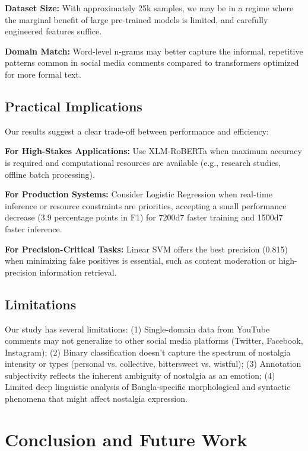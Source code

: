 \documentclass[conference]{IEEEtran}
\begin{document}
\textbf{Dataset Size:} With approximately 25k samples, we may be in a regime where the marginal benefit of large pre-trained models is limited, and carefully engineered features suffice.

\textbf{Domain Match:} Word-level n-grams may better capture the informal, repetitive patterns common in social media comments compared to transformers optimized for more formal text.

\subsection{Practical Implications}

Our results suggest a clear trade-off between performance and efficiency:

\textbf{For High-Stakes Applications:} Use XLM-RoBERTa when maximum accuracy is required and computational resources are available (e.g., research studies, offline batch processing).

\textbf{For Production Systems:} Consider Logistic Regression when real-time inference or resource constraints are priorities, accepting a small performance decrease (3.9 percentage points in F1) for 72\u00d7 faster training and 15\u00d7 faster inference.

\textbf{For Precision-Critical Tasks:} Linear SVM offers the best precision (0.815) when minimizing false positives is essential, such as content moderation or high-precision information retrieval.

\subsection{Limitations}

Our study has several limitations: (1) Single-domain data from YouTube comments may not generalize to other social media platforms (Twitter, Facebook, Instagram); (2) Binary classification doesn't capture the spectrum of nostalgia intensity or types (personal vs. collective, bittersweet vs. wistful); (3) Annotation subjectivity reflects the inherent ambiguity of nostalgia as an emotion; (4) Limited deep linguistic analysis of Bangla-specific morphological and syntactic phenomena that might affect nostalgia expression.

\section{Conclusion and Future Work}
\label{sec:conclusion}
\end{document}
